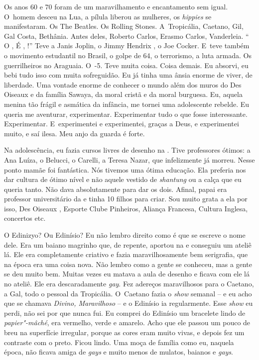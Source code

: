 Os anos 60 e 70 foram de um maravilhamento e encantamento sem igual. O~homem desceu na Lua, a pílula liberou as mulheres, os \emph{hippies} se
manifestaram. Os The Beatles. Os Rolling Stones. A~Tropicália, Caetano,
Gil, Gal Costa, Bethânia. Antes deles, Roberto Carlos, Erasmo Carlos,
Vanderleia. ``  O ,  É , !''
Teve a Janis Joplin, o Jimmy Hendrix , o Joe Cocker. E~teve também o
movimento estudantil no Brasil, o golpe de 64, o terrorismo, a luta
armada. Os guerrilheiros no Araguaia. O~-5. Teve muita coisa. Coisa
demais. Eu absorvi, eu bebi tudo isso com muita sofreguidão. Eu já tinha
uma ânsia enorme de viver, de liberdade. Uma vontade enorme de conhecer
o mundo além dos muros do Des Oiseaux e da família Sawaya, da moral
cristã e da moral burguesa. Eu, aquela menina tão frágil e asmática da
infância, me tornei uma adolescente rebelde. Eu queria me
aventurar, experimentar. Experimentar tudo o que fosse interessante.
Experimentar. E~experimentei e experimentei, graças a Deus, e
experimentei muito, e saí ilesa. Meu anjo da guarda é forte.

Na adolescência, eu fazia cursos livres de desenho na . Tive
professores ótimos: a Ana Luíza, o Belucci, o Carelli, a Teresa Nazar,
que infelizmente já morreu. Nesse ponto mamãe foi fantástica. Nós
tivemos uma ótima educação. Ela preferia nos dar cultura de ótimo nível
e não aquele vestido de \emph{shantung} ou a calça  que eu queria
tanto. Não dava absolutamente para dar os dois. Afinal, papai era
professor universitário da  e tinha 10 filhos para criar. Sou muito
grata a ela por isso, Des Oiseaux , Esporte Clube Pinheiros, Aliança
Francesa, Cultura Inglesa, concertos etc.

O Edinizyo? Ou Edinísio? Eu não lembro direito como é que se escreve o
nome dele. Era um baiano magrinho que, de repente, aportou na  e
conseguiu um ateliê lá. Ele era completamente criativo e fazia maravilhosamente
bem serigrafia, que na época era uma coisa nova. Não lembro como a gente se conheceu, mas a gente se deu muito bem. Muitas vezes eu matava a aula de desenho e ficava com ele lá no ateliê. Ele era descaradamente \emph{gay}. Fez adereços maravilhosos para o Caetano, a Gal, todo o pessoal da Tropicália. O~Caetano
fazia o \emph{show} semanal -- e eu acho que se chamava \emph{Divino, Maravilhoso} -- e o Edinísio ia regularmente. Esse \emph{show} eu perdi, não sei por que nunca fui. Eu comprei do Edinísio um bracelete lindo de \emph{papier"-mâché}, era
vermelho, verde e amarelo. Acho que ele passou um pouco de breu na
superfície irregular, porque as cores eram muito vivas, e depois fez um
contraste com o preto. Ficou lindo. Uma moça de família como eu, naquela
época, não ficava amiga de \emph{gays} e muito menos de mulatos,
baianos e \emph{gays}.

